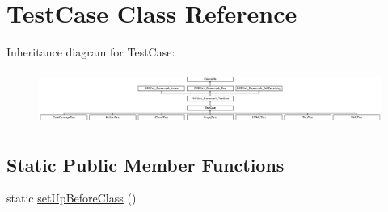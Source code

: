 \hypertarget{class_sebastian_bergmann_1_1_code_coverage_1_1_test_case}{}\section{Test\+Case Class Reference}
\label{class_sebastian_bergmann_1_1_code_coverage_1_1_test_case}
Inheritance diagram for Test\+Case\+:\begin{figure}[H]
\begin{center}
\leavevmode
\includegraphics[height=1.769912cm]{class_sebastian_bergmann_1_1_code_coverage_1_1_test_case}
\end{center}
\end{figure}
\subsection*{Static Public Member Functions}
\begin{DoxyCompactItemize}
\item 
static \mbox{\hyperlink{class_sebastian_bergmann_1_1_code_coverage_1_1_test_case_a80ef9eb20e7443b38276fb4647985fb7}{set\+Up\+Before\+Class}} ()
\end{DoxyCompactItemize}
